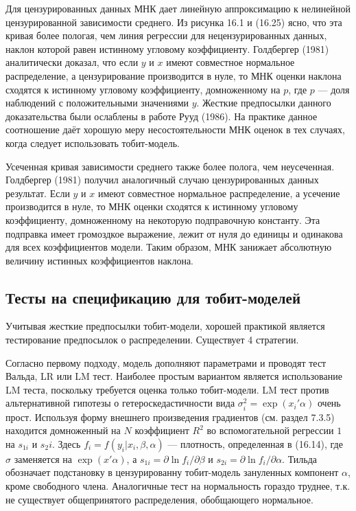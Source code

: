 Для цензурированных данных МНК дает линейную аппроксимацию к нелинейной цензурированной зависимости среднего. Из рисунка 16.1 и (16.25) ясно, что эта кривая более пологая, чем линия регрессии для нецензурированных данных, наклон которой равен истинному угловому коэффициенту. Голдбергер (1981) аналитически доказал, что если $y$ и $x$ имеют совместное нормальное распределение, а цензурирование производится в нуле, то МНК оценки наклона сходятся к истинному угловому коэффициенту, домноженному на $p$, где $p$ --- доля наблюдений с положительными значениями $y$. Жесткие предпосылки данного доказательства были ослаблены в работе Рууд (1986). На практике данное соотношение даёт хорошую меру несостоятельности МНК оценок в тех случаях, когда следует использовать тобит-модель.

Усеченная кривая зависимости среднего также более полога, чем неусеченная. Голдбергер (1981) получил аналогичный случаю цензурированных данных результат. Если $y$ и $x$ имеют совместное нормальное распределение, а усечение производится в нуле, то МНК оценки сходятся к истинному угловому коэффициенту, домноженному на некоторую подправочную константу. Эта подправка имеет громоздкое выражение, лежит от нуля до единицы и одинакова для всех коэффициентов модели. Таким образом, МНК занижает абсолютную величину истинных коэффициентов наклона. 


\subsection{Тесты на спецификацию для тобит-моделей}


Учитывая жесткие предпосылки тобит-модели, хорошей практикой является тестирование предпосылок о распределении. Существует 4 стратегии.

Согласно первому подходу, модель дополняют параметрами и проводят тест Вальда, LR или LM тест. Наиболее простым вариантом является использование LM теста, поскольку требуется оценка только тобит-модели. LM тест против альтернативной гипотезы о гетероскедастичности вида $\sigma_i^2=\exp (x_i'\alpha)$ очень прост. Используя форму внешнего произведения градиентов (см. раздел 7.3.5) находится домноженный на $N$ коэффициент $R^2$ во вспомогательной регрессии $1$ на $s_{1i}$ и $s_2i$. Здесь $f_i=f(y_i|x_i,\beta,\alpha)$ --- плотность, определенная в (16.14), где $\sigma$ заменяется на $\exp (x'\alpha)$, а $s_{1i}=\partial \ln f_i/\partial\beta$ и $s_{2i}=\partial \ln f_{i}/\partial \alpha$.  Тильда обозначает подстановку в  цензурированну тобит-модель зануленных компонент $\alpha$, кроме свободного члена. Аналогичные тест на нормальность гораздо труднее, т.к. не существует общепринятого распределения, обобщающего нормальное.


